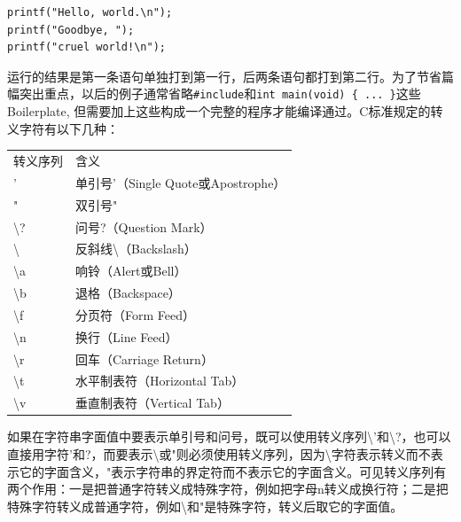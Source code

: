 \documentclass[12pt]{book}
\begin{document}
\begin{verbatim}
printf("Hello, world.\n");
printf("Goodbye, ");
printf("cruel world!\n");
\end{verbatim}

运行的结果是第一条语句单独打到第一行，后两条语句都打到第二行。为了节省篇幅突出重点，以后的例子通常省略\texttt{\#include}和\texttt{int\ main(void)\ \{\ ...\ \}}这些Boilerplate,
但需要加上这些构成一个完整的程序才能编译通过。C标准规定的转义字符有以下几种：

\begin{tabular}{ll}
转义序列 & 含义 \\
' & 单引号'（Single Quote或Apostrophe） \\
" & 双引号" \\
\textbackslash? & 问号?（Question Mark） \\
\textbackslash{} & 反斜线\textbackslash（Backslash） \\
\textbackslash a & 响铃（Alert或Bell） \\
\textbackslash b & 退格（Backspace） \\
\textbackslash f & 分页符（Form Feed） \\
\textbackslash n & 换行（Line Feed） \\
\textbackslash r & 回车（Carriage Return） \\
\textbackslash t & 水平制表符（Horizontal Tab） \\
\textbackslash v & 垂直制表符（Vertical Tab） \\
\end{tabular}

如果在字符串字面值中要表示单引号和问号，既可以使用转义序列\textbackslash'和\textbackslash?，也可以直接用字符'和?，而要表示\textbackslash 或"则必须使用转义序列，因为\textbackslash 字符表示转义而不表示它的字面含义，"表示字符串的界定符而不表示它的字面含义。可见转义序列有两个作用：一是把普通字符转义成特殊字符，例如把字母n转义成换行符；二是把特殊字符转义成普通字符，例如\textbackslash 和"是特殊字符，转义后取它的字面值。
\end{document}
